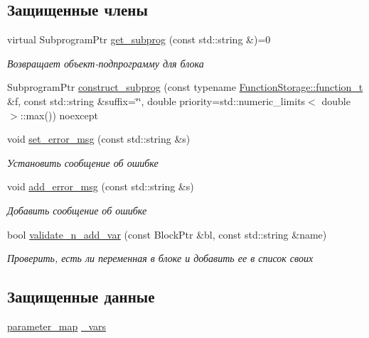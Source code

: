 \subsection*{Защищенные члены}
\begin{DoxyCompactItemize}
\item 
virtual Subprogram\-Ptr \hyperlink{classLIBKMS__namespace_1_1BlockClass_abc277736d9a2dd4eabea3c737b027682}{get\-\_\-subprog} (const std\-::string \&)=0
\begin{DoxyCompactList}\small\item\em Возвращает объект-\/подпрограмму для блока \end{DoxyCompactList}\item 
Subprogram\-Ptr \hyperlink{classLIBKMS__namespace_1_1BlockClass_a173ced5accd8f44d49741583c59d3cf6}{construct\-\_\-subprog} (const typename \hyperlink{classLIBKMS__namespace_1_1FunctionStorage_a0319ecd6e0ca02ee509c5f6b6edeb072}{Function\-Storage\-::function\-\_\-t} \&f, const std\-::string \&suffix=\char`\"{}\char`\"{}, double priority=std\-::numeric\-\_\-limits$<$ double $>$\-::max()) noexcept
\item 
void \hyperlink{classLIBKMS__namespace_1_1BlockClass_a451efd541327bb76ec4aaa1037c5a9da}{set\-\_\-error\-\_\-msg} (const std\-::string \&s)
\begin{DoxyCompactList}\small\item\em Установить сообщение об ошибке \end{DoxyCompactList}\item 
void \hyperlink{classLIBKMS__namespace_1_1BlockClass_ada0b765d7e9db7966c55469de098c2d9}{add\-\_\-error\-\_\-msg} (const std\-::string \&s)
\begin{DoxyCompactList}\small\item\em Добавить сообщение об ошибке \end{DoxyCompactList}\item 
bool \hyperlink{classLIBKMS__namespace_1_1BlockClass_abff04bac1fc3b2c50f9afe056d8aa33d}{validate\-\_\-n\-\_\-add\-\_\-var} (const Block\-Ptr \&bl, const std\-::string \&name)
\begin{DoxyCompactList}\small\item\em Проверить, есть ли переменная в блоке и добавить ее в список своих \end{DoxyCompactList}\end{DoxyCompactItemize}
\subsection*{Защищенные данные}
\begin{DoxyCompactItemize}
\item 
\hyperlink{classLIBKMS__namespace_1_1BlockClass_a3cd7da1e7c30b9f047e99b6c1c433ff4}{parameter\-\_\-map} \hyperlink{classLIBKMS__namespace_1_1BlockClass_a67c59fc343b2a7b7b54ab36c55f38484}{\-\_\-vars}
\end{DoxyCompactItemize}


